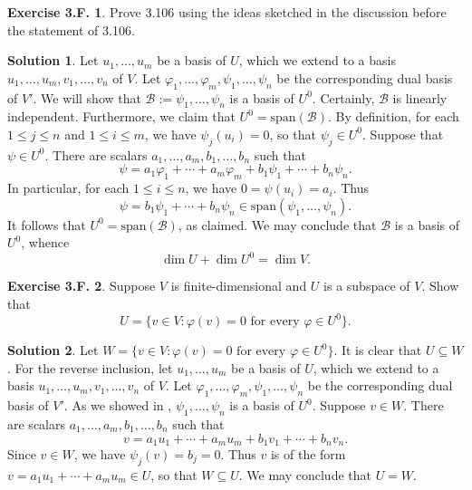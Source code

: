 \documentclass[12pt]{article}
\theoremstyle{definition}
\theoremstyle{exercise}
\newtheorem{exercise}{Exercise 3.F.}
\theoremstyle{solution}
\newtheorem*{solution}{Solution}
\newcommand{\Span}{\text{span}}
\begin{document}
\begin{exercise}
\label{ex:24}
    Prove 3.106 using the ideas sketched in the discussion before the statement of 3.106.
\end{exercise}

\begin{solution}
    Let \( u_1, \ldots, u_m \) be a basis of \( U \), which we extend to a basis \( u_1, \ldots, u_m, v_1, \ldots, v_n \) of \( V \). Let \( \varphi_1, \ldots, \varphi_m, \psi_1, \ldots, \psi_n \) be the corresponding dual basis of \( V' \). We will show that \( \mathscr{B} := \psi_1, \ldots, \psi_n \) is a basis of \( U^0 \). Certainly, \( \mathscr{B} \) is linearly independent. Furthermore, we claim that \( U^0 = \Span(\mathscr{B}) \). By definition, for each \( 1 \leq j \leq n \) and \( 1 \leq i \leq m \), we have \( \psi_j(u_i) = 0 \), so that \( \psi_j \in U^0 \). Suppose that \( \psi \in U^0 \). There are scalars \( a_1, \ldots, a_m, b_1, \ldots, b_n \) such that
    \[
        \psi = a_1 \varphi_1 + \cdots + a_m \varphi_m + b_1 \psi_1 + \cdots + b_n \psi_n.
    \]
    In particular, for each \( 1 \leq i \leq n \), we have \( 0 = \psi(u_i) = a_i \). Thus
    \[
        \psi = b_1 \psi_1 + \cdots + b_n \psi_n \in \Span(\psi_1, \ldots, \psi_n).
    \]
    It follows that \( U^0 = \Span(\mathscr{B}) \), as claimed. We may conclude that \( \mathscr{B} \) is a basis of \( U^0 \), whence
    \[
        \dim U + \dim U^0 = \dim V.
    \]
\end{solution}

\begin{exercise}
\label{ex:25}
    Suppose \( V \) is finite-dimensional and \( U \) is a subspace of \( V \). Show that
    \[
        U = \{ v \in V : \varphi(v) = 0 \text{ for every } \varphi \in U^0 \}.
    \]
\end{exercise}

\begin{solution}
    Let \( W = \{ v \in V : \varphi(v) = 0 \text{ for every } \varphi \in U^0 \} \). It is clear that \( U \subseteq W \). For the reverse inclusion, let \( u_1, \ldots, u_m \) be a basis of \( U \), which we extend to a basis \( u_1, \ldots, u_m, v_1, \ldots, v_n \) of \( V \). Let \( \varphi_1, \ldots, \varphi_m, \psi_1, \ldots, \psi_n \) be the corresponding dual basis of \( V' \). As we showed in , \( \psi_1, \ldots, \psi_n \) is a basis of \( U^0 \). Suppose \( v \in W \). There are scalars \( a_1, \ldots, a_m, b_1, \ldots, b_n \) such that
    \[
        v = a_1 u_1 + \cdots + a_m u_m + b_1 v_1 + \cdots + b_n v_n.
    \]
    Since \( v \in W \), we have \( \psi_j(v) = b_j = 0 \). Thus \( v \) is of the form \( v = a_1 u_1 + \cdots + a_m u_m \in U \), so that \( W \subseteq U \). We may conclude that \( U = W \).
\end{solution}
\end{document}
